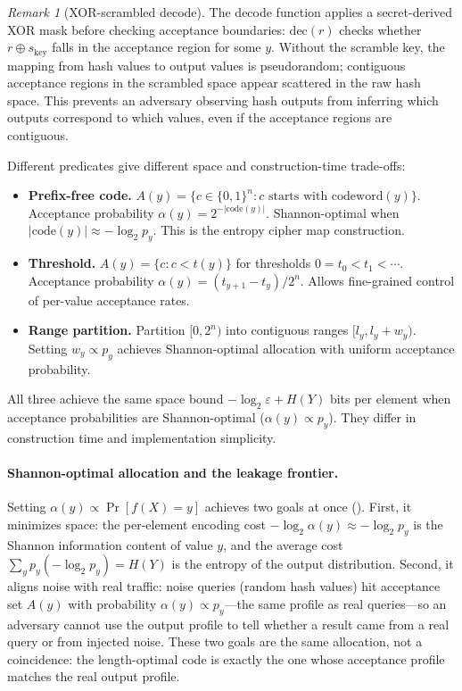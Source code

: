 \documentclass[11pt]{article}
\theoremstyle{definition}
\theoremstyle{plain}
\theoremstyle{remark}
\newtheorem{remark}{Remark}[section]
\newcommand{\dec}{\mathrm{dec}}
\begin{document}
\begin{remark}[XOR-scrambled decode]
The decode function applies a secret-derived XOR mask before checking
acceptance boundaries: $\dec(r)$ checks whether $r \oplus s_{\mathrm{key}}$
falls in the acceptance region for some $y$.  Without the scramble key, the
mapping from hash values to output values is pseudorandom; contiguous
acceptance regions in the scrambled space appear scattered in the raw hash
space.  This prevents an adversary observing hash outputs from inferring
which outputs correspond to which values, even if the acceptance regions are
contiguous.
\end{remark}

Different predicates give different space and construction-time trade-offs:
\begin{itemize}
\item \textbf{Prefix-free code.}
    $A(y) = \{c \in \{0,1\}^n : c \text{ starts with codeword}(y)\}$.
    Acceptance probability $\alpha(y) = 2^{-|\text{code}(y)|}$.
    Shannon-optimal when $|\text{code}(y)| \approx -\log_2 p_y$.
    This is the entropy cipher map construction.
\item \textbf{Threshold.}
    $A(y) = \{c : c < t(y)\}$ for thresholds $0 = t_0 < t_1 < \cdots$.
    Acceptance probability $\alpha(y) = (t_{y+1} - t_y) / 2^n$.
    Allows fine-grained control of per-value acceptance rates.
\item \textbf{Range partition.}
    Partition $[0, 2^n)$ into contiguous ranges $[l_y, l_y + w_y)$.
    Setting $w_y \propto p_y$ achieves Shannon-optimal allocation with
    uniform acceptance probability.
\end{itemize}

All three achieve the same space bound $-\log_2 \varepsilon + H(Y)$
bits per element when acceptance probabilities are Shannon-optimal
($\alpha(y) \propto p_y$).  They differ in construction time and
implementation simplicity.

\paragraph{Shannon-optimal allocation and the leakage frontier.}
Setting $\alpha(y) \propto \Pr[f(X)=y]$ achieves two goals at once
().
First, it minimizes space: the per-element encoding cost
$-\log_2 \alpha(y) \approx -\log_2 p_y$ is the Shannon information content
of value $y$, and the average cost
$\sum_y p_y (-\log_2 p_y) = H(Y)$ is the entropy of the output
distribution.  Second, it aligns noise with real traffic: noise queries
(random hash values) hit acceptance set $A(y)$ with probability
$\alpha(y) \propto p_y$---the same profile as real queries---so an
adversary cannot use the output profile to tell whether a result came from
a real query or from injected noise.  These two goals are the same
allocation, not a coincidence: the length-optimal code is exactly the one
whose acceptance profile matches the real output profile.
\end{document}
